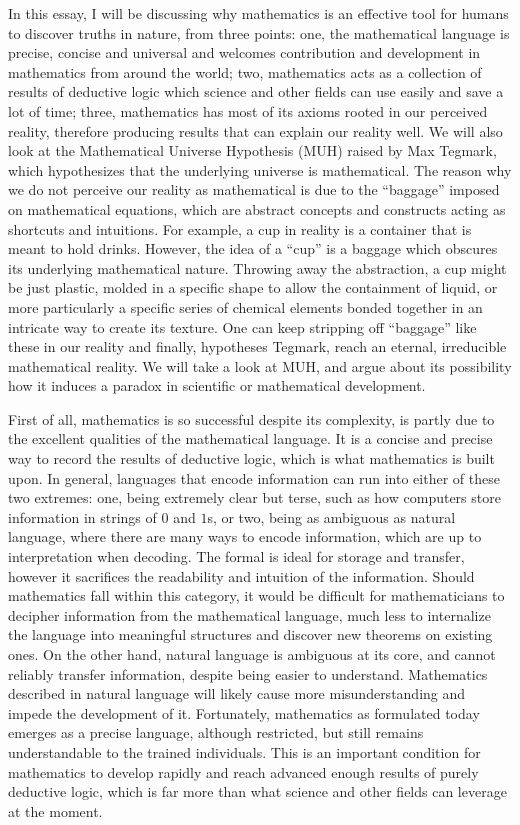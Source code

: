 \documentclass[a4paper]{article}
\newcommand{\0}{\{\}}
\newcommand{\1}{\{\0\}}
\newcommand{\2}{\{\0,\1\}}
\newcommand{\3}{\{\0,\1,\2\}}
\newcommand{\4}{\{\0,\1,\2,\3\}}
\newcommand{\5}{\{\0,\1,\2,\3,\4\}}
\begin{document}
In this essay, I will be discussing why mathematics is an effective tool for
humans to discover truths in nature, from three points: one, the mathematical
language is precise, concise and universal and welcomes contribution and
development in mathematics from around the world; two, mathematics acts as a
collection of results of deductive logic which science and other fields can use
easily and save a lot of time; three, mathematics has most of its axioms rooted
in our perceived reality, therefore producing results that can explain our
reality well. We will also look at the Mathematical Universe Hypothesis (MUH)
raised by Max Tegmark, which hypothesizes that the underlying universe is
mathematical\cite{muh}. The reason why we do not perceive our reality as mathematical is
due to the “baggage” imposed on mathematical equations, which are abstract
concepts and constructs acting as shortcuts and intuitions. For example, a cup
in reality is a container that is meant to hold drinks. However, the idea of a
“cup” is a baggage which obscures its underlying mathematical nature. Throwing
away the abstraction, a cup might be just plastic, molded in a specific shape to
allow the containment of liquid, or more particularly a specific series of
chemical elements bonded together in an intricate way to create its texture. One
can keep stripping off “baggage” like these in our reality and finally,
hypotheses Tegmark, reach an eternal, irreducible mathematical reality. We will
take a look at MUH, and argue about its possibility how it induces a paradox in
scientific or mathematical development.

First of all, mathematics is so successful despite its complexity, is partly due
to the excellent qualities of the mathematical language. It is a concise and
precise way to record the results of deductive logic, which is what mathematics
is built upon. In general, languages that encode information can run into either
of these two extremes: one, being extremely clear but terse, such as how
computers store information in strings of $0$ and $1$s, or two, being as
ambiguous as natural language, where there are many ways to encode information,
which are up to interpretation when decoding. The formal is ideal for storage
and transfer, however it sacrifices the readability and intuition of the
information. Should mathematics fall within this category, it would be difficult
for mathematicians to decipher information from the mathematical language, much
less to internalize the language into meaningful structures and discover new
theorems on existing ones. On the other hand, natural language is ambiguous at
its core, and cannot reliably transfer information, despite being easier to
understand. Mathematics described in natural language will likely cause more
misunderstanding and impede the development of it. Fortunately, mathematics as
formulated today emerges as a precise language, although restricted, but still
remains understandable to the trained individuals. This is an important
condition for mathematics to develop rapidly and reach advanced enough results
of purely deductive logic, which is far more than what science and other fields
can leverage at the moment.
\end{document}
